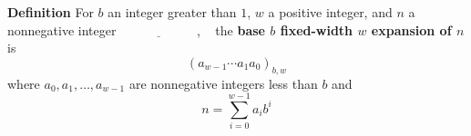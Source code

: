 
{\bf Definition} For $b$ an integer greater than $1$, $w$ a positive integer, 
and $n$ a nonnegative integer
$\underline{\phantom{\hspace{1in}}}$, ~
the {\bf base $b$ fixed-width $w$ expansion of $n$}  is
\[
(a_{w-1} \cdots a_1 a_0)_{b,w}
\]
where  $a_0, a_1, \ldots, a_{w-1}$ are nonnegative integers less than $b$ and
\[
n =  \sum_{i=0}^{w-1} a_{i} b^{i}
\]
